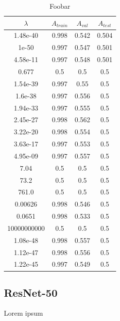 \begin{table}[ht]
\centering
\begin{tabular}{ |c|c|c|c| }
\hline
$\lambda$ & $A_{train}$ & $A_{val}$ & $A_{test}$ \\
\hline
1.48e-40 & 0.998 & 0.542 & 0.504 \\
1e-50 & 0.997 & 0.547 & 0.501 \\
4.58e-11 & 0.997 & 0.548 & 0.501 \\
0.677 & 0.5 & 0.5 & 0.5 \\
1.54e-39 & 0.997 & 0.55 & 0.5 \\
1.6e-38 & 0.997 & 0.556 & 0.5 \\
1.94e-33 & 0.997 & 0.555 & 0.5 \\
2.45e-27 & 0.998 & 0.562 & 0.5 \\
3.22e-20 & 0.998 & 0.554 & 0.5 \\
3.63e-17 & 0.997 & 0.553 & 0.5 \\
4.95e-09 & 0.997 & 0.557 & 0.5 \\
7.04 & 0.5 & 0.5 & 0.5 \\
73.2 & 0.5 & 0.5 & 0.5 \\
761.0 & 0.5 & 0.5 & 0.5 \\
0.00626 & 0.998 & 0.546 & 0.5 \\
0.0651 & 0.998 & 0.533 & 0.5 \\
10000000000 & 0.5 & 0.5 & 0.5 \\
1.08e-48 & 0.998 & 0.557 & 0.5 \\
1.12e-47 & 0.998 & 0.556 & 0.5 \\
1.22e-45 & 0.997 & 0.549 & 0.5 \\
\hline
\end{tabular}
\caption{Foobar}
\label{table:foobar}
\end{table}


\subsection{ResNet-50}
Lorem ipsum

